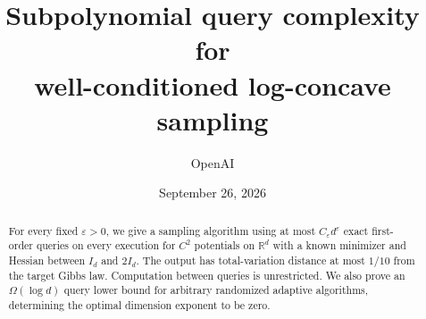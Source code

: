 \documentclass[11pt]{article}
\title{Subpolynomial query complexity for\\well-conditioned log-concave sampling}
\author{OpenAI}
\date{September 26, 2026}
\theoremstyle{definition}
\theoremstyle{remark}
\newcommand{\R}{\mathbb R}
\numberwithin{equation}{section}
\begin{document}
\maketitle
\begin{abstract}
For every fixed $\varepsilon>0$, we give a sampling algorithm using
at most $C_\varepsilon d^\varepsilon$ exact first-order queries on
every execution for $C^2$ potentials on $\R^d$ with a known minimizer
and Hessian between $I_d$ and $2I_d$. The output has total-variation
distance at most $1/10$ from the target Gibbs law. Computation between
queries is unrestricted. We also prove an $\Omega(\log d)$ query lower
bound for arbitrary randomized adaptive algorithms, determining the
optimal dimension exponent to be zero.
\end{abstract}











\end{document}
